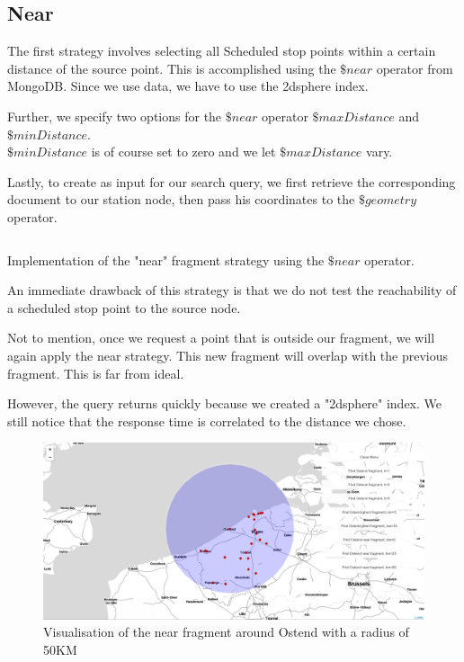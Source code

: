 \subsection{Near}
The first strategy involves selecting all Scheduled stop points within a certain distance of the source point. This is accomplished using the $\$near$ operator\cite{noauthor_near_nodate} from MongoDB. Since we use  data, we have to use the 2dsphere index. 

Further, we specify two options for the $\$near$ operator $\$maxDistance$ and $\$minDistance$.\\ $\$minDistance$ is of course set to zero and we let $\$maxDistance$ vary. 

Lastly, to create  as input for our search query, we first retrieve the corresponding document to our station node, then pass his coordinates to the $\$geometry$ operator.

\begin{listing}[H]
    \inputminted[linenos,frame=single,breaklines]{TypeScript}{code/near.ts}
    \caption{Implementation of the "near" fragment strategy using the $\$near$ operator.}
\end{listing}

An immediate drawback of this strategy is that we do not test the reachability of a scheduled stop point to the source node.

Not to mention, once we request a point that is outside our fragment, we will again apply the near strategy. This new fragment will overlap with the previous fragment. This is far from ideal.



However, the query returns quickly because we created a "2dsphere" index. We still notice that the response time is correlated to the distance we chose. 

\begin{figure}[H]
    \centering
    \includegraphics[width=\textwidth]{images/near visualized.png}
    \caption{Visualisation of the near fragment around Ostend with a radius of 50KM}
    \label{fig:near-visualized}
\end{figure}
